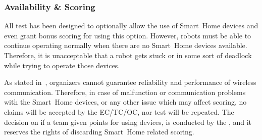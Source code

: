 \subsubsection{Availability \& Scoring}
All test has been designed to optionally allow the use of Smart~Home devices and even grant bonus scoring for using this option. However, robots must be able to continue operating normally when there are no Smart~Home devices available. Therefore, it is unacceptable that a robot gets stuck or in some sort of deadlock while trying to operate those devices.

As stated in~, organizers cannot guarantee reliability and performance of wireless communication. Therefore, in case of malfunction or communication problems with the Smart~Home devices, or any other issue which may affect scoring, no claims will be accepted by the EC/TC/OC, nor test will be repeated. The decision on if a team given points for using  devices, is conducted by the , and it reserves the rights of discarding Smart~Home related scoring.


